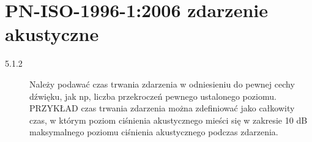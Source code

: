 \documentclass[12pt,a4paper]{article}
\author{Konrad Janowski}
\begin{document}
\section{PN-ISO-1996-1:2006 zdarzenie akustyczne}
\begin{description}
\item[5.1.2] Należy podawać czas trwania zdarzenia w odniesieniu do pewnej cechy dźwięku, jak np, liczba przekroczeń pewnego ustalonego poziomu. 
PRZYKŁAD czas trwania zdarzenia można zdefiniować jako całkowity czas, w którym poziom ciśnienia akustycznego mieści się w zakresie 10 dB maksymalnego poziomu ciśnienia akustycznego podczas zdarzenia.
\end{description}
\end{document}

